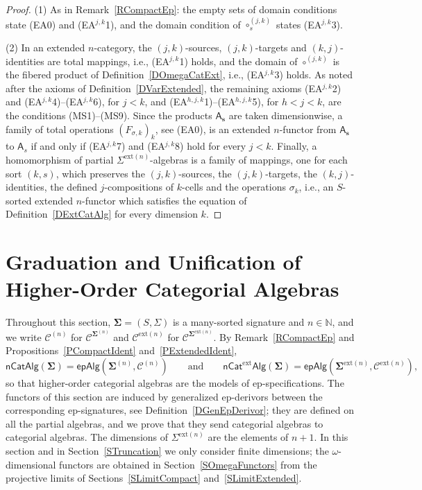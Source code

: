 \documentclass{amsart}
\theoremstyle{plain}
\theoremstyle{definition}
\begin{document}
\begin{proof}
(1) As in Remark~\ref{RCompactEp}: the empty sets of domain conditions state (EA0) and (EA$^{j,k}$1), and the domain condition of $\circ^{(j,k)}_{s}$ states (EA$^{j,k}$3).

(2) In an extended $n$-category, the $(j,k)$-sources, $(j,k)$-targets and $(k,j)$-identities are total mappings, i.e., (EA$^{j,k}$1) holds, and the domain of $\circ^{(j,k)}$ is the fibered product of Definition~\ref{DOmegaCatExt}, i.e., (EA$^{j,k}$3) holds. As noted after the axioms of Definition~\ref{DVarExtended}, the remaining axioms (EA$^{j,k}$2) and (EA$^{j,k}$4)--(EA$^{j,k}$6), for $j<k$, and (EA$^{h,j,k}$1)--(EA$^{h,j,k}$5), for $h<j<k$, are the conditions (MS1)--(MS9). Since the products $\mathsf{A}_{\mathbf{s}}$ are taken dimensionwise, a family of total operations $(F_{\sigma,k})_{k}$, see (EA0), is an extended $n$-functor from $\mathsf{A}_{\mathbf{s}}$ to $\mathsf{A}_{s}$ if and only if (EA$^{j,k}$7) and (EA$^{j,k}$8) hold for every $j<k$. Finally, a homomorphism of partial $\Sigma^{\mathrm{ext}(n)}$-algebras is a family of mappings, one for each sort $(k,s)$, which preserves the $(j,k)$-sources, the $(j,k)$-targets, the $(k,j)$-identities, the defined $j$-compositions of $k$-cells and the operations $\sigma_{k}$, i.e., an $S$-sorted extended $n$-functor which satisfies the equation of Definition~\ref{DExtCatAlg} for every dimension $k$.
\end{proof}

\section{Graduation and Unification of Higher-Order Categorial Algebras}\label{SGraduation}

Throughout this section, $\mathbf{\Sigma}=(S,\Sigma)$ is a many-sorted signature and $n\in\mathbb{N}$, and we write $\mathcal{C}^{(n)}$ for $\mathcal{C}^{\mathbf{\Sigma}^{(n)}}$ and $\mathcal{C}^{\mathrm{ext}(n)}$ for $\mathcal{C}^{\mathbf{\Sigma}^{\mathrm{ext}(n)}}$. By Remark~\ref{RCompactEp} and Propositions~\ref{PCompactIdent} and~\ref{PExtendedIdent},
$$
\mathsf{nCatAlg}(\mathbf{\Sigma})=\mathsf{epAlg}(\mathbf{\Sigma}^{(n)},\mathcal{C}^{(n)})
\qquad\text{and}\qquad
\mathsf{nCat}^{\mathrm{ext}}\mathsf{Alg}(\mathbf{\Sigma})=\mathsf{epAlg}(\mathbf{\Sigma}^{\mathrm{ext}(n)},\mathcal{C}^{\mathrm{ext}(n)}),
$$
so that higher-order categorial algebras are the models of ep-specifications. The functors of this section are induced by generalized ep-derivors between the corresponding ep-signatures, see Definition~\ref{DGenEpDerivor}; they are defined on all the partial algebras, and we prove that they send categorial algebras to categorial algebras. The dimensions of $\Sigma^{\mathrm{ext}(n)}$ are the elements of $n+1$. In this section and in Section~\ref{STruncation} we only consider finite dimensions; the $\omega$-dimensional functors are obtained in Section~\ref{SOmegaFunctors} from the projective limits of Sections~\ref{SLimitCompact} and~\ref{SLimitExtended}.
\end{document}

